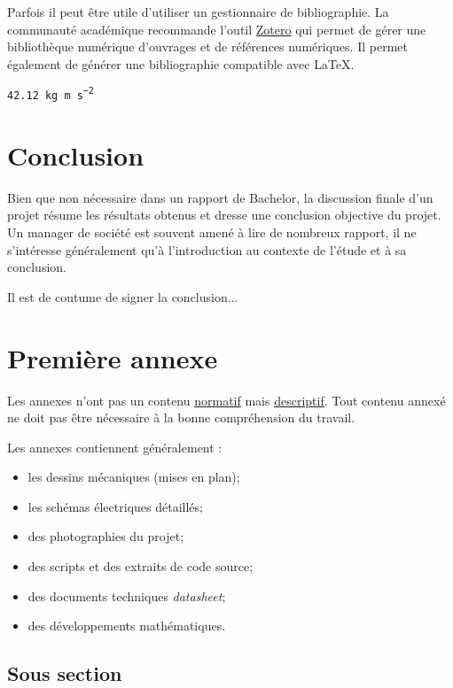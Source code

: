\documentclass[
    iai, %
    il, %
]{heig-tb}
\begin{document}
Parfois il peut être utile d'utiliser un gestionnaire de bibliographie. La communauté académique recommande l'outil \href{https://www.zotero.org/}{Zotero} qui permet de gérer une bibliothèque numérique d'ouvrages et de références numériques. Il permet également de générer une bibliographie compatible avec \LaTeX.


\texttt{\SI{42.12}{\kilo\gram\metre\per\square\second}}\par

\chapter{Conclusion}

Bien que non nécessaire dans un rapport de Bachelor, la discussion finale d'un projet résume les résultats obtenus et dresse une conclusion objective du projet. Un manager de société est souvent amené à lire de nombreux rapport, il ne s'intéresse généralement qu'à l'introduction au contexte de l'étude et à sa conclusion.

Il est de coutume de signer la conclusion...

\vfil
\hspace{8cm}\makeatletter\@author\makeatother\par
\hspace{8cm}\begin{minipage}{5cm}
    \printsignature
\end{minipage}
\clearpage

\appendix
\appendixpage
\addappheadtotoc

\chapter{Première annexe}

Les annexes n'ont pas un contenu \underline{normatif} mais \underline{descriptif}. Tout contenu annexé ne doit pas être nécessaire à la bonne compréhension du travail.

Les annexes contiennent généralement :

\begin{itemize}
    \item les dessins mécaniques (mises en plan);
    \item les schémas électriques détaillés;
    \item des photographies du projet;
    \item des scripts et des extraits de code source;
    \item des documents techniques \pex \emph{datasheet};
    \item des développements mathématiques.
\end{itemize}
\section{Sous section}
\lipsum[1]

\let\cleardoublepage\clearpage
\backmatter

\label{glossaire}
\printnoidxglossary
\printbibliography
\label{index}
\printindex
\end{document}
